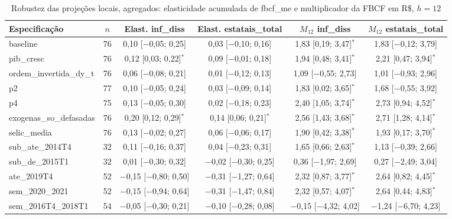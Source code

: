 \begin{table}[htbp]
\centering
\caption{Robustez das proje\c{c}\~oes locais, agregados: elasticidade acumulada de fbcf\_me e multiplicador da FBCF em R\$, $h = 12$}
\label{tab:a6_lp_rob_agr}
\scriptsize
\begin{adjustbox}{max width=\linewidth}
\begin{tabular}{lccccc}
\toprule
Especifica\c{c}\~ao & $n$ & Elast. inf\_diss & Elast. estatais\_total & $M_{12}$ inf\_diss & $M_{12}$ estatais\_total \\
\midrule
baseline & 76 & 0{,}10 [$-$0{,}05; 0{,}25] & 0{,}03 [$-$0{,}10; 0{,}16] & 1{,}83 [0{,}19; 3{,}47]$^{*}$ & 1{,}83 [$-$0{,}12; 3{,}79] \\
pib\_cresc & 76 & 0{,}12 [0{,}03; 0{,}22]$^{*}$ & 0{,}09 [$-$0{,}01; 0{,}18] & 1{,}94 [0{,}48; 3{,}41]$^{*}$ & 2{,}21 [0{,}47; 3{,}94]$^{*}$ \\
ordem\_invertida\_dy\_t & 76 & 0{,}06 [$-$0{,}08; 0{,}21] & 0{,}01 [$-$0{,}12; 0{,}13] & 1{,}09 [$-$0{,}55; 2{,}73] & 1{,}01 [$-$0{,}93; 2{,}96] \\
p2 & 77 & 0{,}10 [$-$0{,}05; 0{,}24] & 0{,}03 [$-$0{,}09; 0{,}14] & 1{,}83 [0{,}02; 3{,}65]$^{*}$ & 1{,}68 [$-$0{,}55; 3{,}92] \\
p4 & 75 & 0{,}13 [$-$0{,}05; 0{,}30] & 0{,}02 [$-$0{,}18; 0{,}23] & 2{,}40 [1{,}05; 3{,}74]$^{*}$ & 2{,}73 [0{,}94; 4{,}52]$^{*}$ \\
exogenas\_so\_defasadas & 76 & 0{,}20 [0{,}12; 0{,}29]$^{*}$ & 0{,}14 [0{,}06; 0{,}21]$^{*}$ & 2{,}56 [1{,}43; 3{,}68]$^{*}$ & 2{,}71 [1{,}28; 4{,}14]$^{*}$ \\
selic\_media & 76 & 0{,}13 [$-$0{,}02; 0{,}27] & 0{,}06 [$-$0{,}06; 0{,}17] & 1{,}90 [0{,}42; 3{,}38]$^{*}$ & 1{,}93 [0{,}17; 3{,}70]$^{*}$ \\
sub\_ate\_2014T4 & 32 & 0{,}11 [$-$0{,}16; 0{,}37] & 0{,}04 [$-$0{,}23; 0{,}31] & 1{,}65 [0{,}66; 2{,}63]$^{*}$ & 1{,}13 [$-$0{,}39; 2{,}66] \\
sub\_de\_2015T1 & 32 & 0{,}01 [$-$0{,}30; 0{,}32] & $-$0{,}02 [$-$0{,}30; 0{,}25] & 0{,}36 [$-$1{,}97; 2{,}69] & 0{,}27 [$-$2{,}49; 3{,}04] \\
ate\_2019T4 & 52 & $-$0{,}15 [$-$0{,}80; 0{,}50] & $-$0{,}31 [$-$1{,}27; 0{,}64] & 2{,}32 [0{,}87; 3{,}77]$^{*}$ & 2{,}64 [0{,}82; 4{,}45]$^{*}$ \\
sem\_2020\_2021 & 52 & $-$0{,}15 [$-$0{,}94; 0{,}64] & $-$0{,}31 [$-$1{,}47; 0{,}84] & 2{,}32 [0{,}57; 4{,}07]$^{*}$ & 2{,}64 [0{,}44; 4{,}83]$^{*}$ \\
sem\_2016T4\_2018T1 & 54 & $-$0{,}05 [$-$0{,}30; 0{,}21] & $-$0{,}10 [$-$0{,}28; 0{,}08] & $-$0{,}15 [$-$4{,}32; 4{,}02] & $-$1{,}24 [$-$6{,}70; 4{,}23] \\

\end{tabular}
\end{adjustbox}
\end{table}
